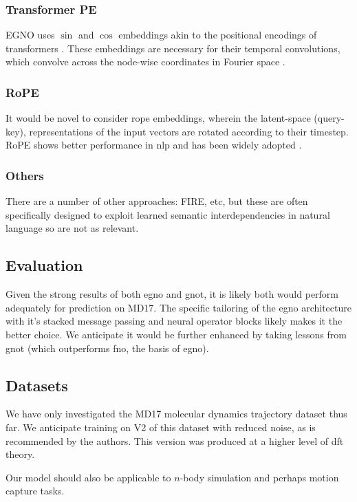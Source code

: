 \documentclass{article}
\begin{document}
\subsubsection{Transformer PE}
EGNO uses $\sin$ and $\cos$ embeddings akin to the positional encodings of transformers \cite{vaswani_attention_2017, xu_equivariant_2024}. These embeddings are necessary for their temporal convolutions, which convolve across the node-wise coordinates in Fourier space \cite{xu_equivariant_2024}.

\subsubsection{RoPE}
It would be novel to consider \gls{rope} embeddings, wherein the latent-space (query-key), representations of the input vectors are rotated according to their timestep. RoPE \cite{su_roformer_2023} shows better performance in \gls{nlp} and has been widely adopted \cite{grattafiori_llama_2024}. 

\subsubsection{Others}
There are a number of other approaches: FIRE, etc, but these are often specifically designed to exploit learned semantic interdependencies in natural language so are not as relevant.

\subsection{Evaluation}
Given the strong results of both \gls{egno} and \gls{gnot}, it is likely both would perform adequately for prediction on MD17. The specific tailoring of the \gls{egno} architecture with it's stacked message passing and neural operator blocks likely makes it the better choice. We anticipate it would be further enhanced by taking lessons from \gls{gnot} (which outperforms \gls{fno}, the basis of \gls{egno}).

\subsection{Datasets}
We have only investigated the MD17 molecular dynamics trajectory dataset thus far. We anticipate training on V2 of this dataset with reduced noise, as is recommended by the authors. This version was produced at a higher level of \gls{dft} theory.

Our model should also be applicable to \(n\)-body simulation and perhaps motion capture tasks.
\end{document}

